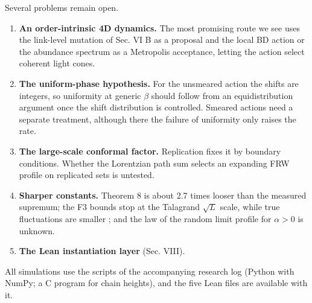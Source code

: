 Several problems remain open.

\begin{enumerate}
\def\labelenumi{\arabic{enumi}.}
\tightlist
\item
  \textbf{An order-intrinsic 4D dynamics.} The most
  promising route we see uses the link-level mutation of
  Sec. VI B as a proposal and the local BD action or the
  abundance spectrum as a Metropolis acceptance, letting the
  action select coherent light cones.
\item
  \textbf{The uniform-phase hypothesis.} For the unsmeared
  action the shifts are integers, so uniformity at generic
  \(\beta\) should follow from an equidistribution argument
  once the shift distribution is controlled. Smeared actions
  need a separate treatment, although there the failure of
  uniformity only raises the rate.
\item
  \textbf{The large-scale conformal factor.} Replication
  fixes it by boundary conditions. Whether the Lorentzian
  path sum selects an expanding FRW profile on replicated
  sets is untested.
\item
  \textbf{Sharper constants.} Theorem 8 is about 2.7 times
  looser than the measured supremum; the F3 bounds stop at
  the Talagrand \(\sqrt L\) scale, while true fluctuations
  are smaller \cite{BDJ99, BL15}; and the law of the random
  limit profile for \(\alpha>0\) is unknown.
\item
  \textbf{The Lean instantiation layer} (Sec. VIII).
\end{enumerate}

All simulations use the scripts of the accompanying research
log (Python with NumPy; a C program for chain heights), and
the five Lean files are available with it.
